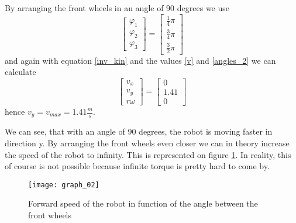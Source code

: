 \documentclass[paper=a4, fontsize=11pt]{scrartcl} %
\begin{document}
By arranging the front wheels in an angle of 90 degrees we use
\begin{equation}
    \label{angles_2}
    \begin{bmatrix}
        \varphi_1\\
        \varphi_2\\
        \varphi_3
    \end{bmatrix}
    = \begin{bmatrix}
        \frac{1}{4}\pi\\
        \frac{3}{4}\pi\\
        \frac{3}{2}\pi
    \end{bmatrix}
\end{equation}
and again with equation \ref{inv_kin} and the values \ref{v} and \ref{angles_2} we can calculate
\begin{equation}
    \begin{bmatrix}
        v_x\\
        v_y\\
        r \omega
    \end{bmatrix}
    = \begin{bmatrix}
        0\\
        1.41\\
        0
    \end{bmatrix}
\end{equation}
hence $ v_y = v_{max} = 1.41 \frac{m}{s}$.

We can see, that with an angle of 90 degrees, the robot is moving faster in
direction y. By arranging the front wheels even closer we can in theory
increase the speed of the robot to infinity. This is represented on figure
\ref{fig:speed}. In reality, this of course is not possible because infinite
torque is pretty hard to come by.
\begin{figure}[h]
    \texttt{[image: graph\_02]}
    \caption{Forward speed of the robot in function of the angle between the
        front wheels}\label{fig:speed}
\end{figure}
\end{document}
